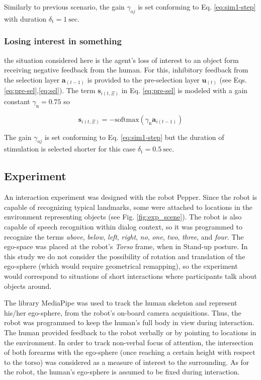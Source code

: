 \documentclass[letterpaper, 10 pt, conference]{ieeeconf}  %
\begin{document}
	\noindent Similarly to previous scenario, the gain $\gamma_{\mathrm{o}j}$ is set conforming to Eq. \eqref{eq:sim1-step} with duration $\delta_\mathrm{t} = 1\ \mathrm{sec}$. 
	
	\subsubsection{Losing interest in something} the situation considered here is the agent's loss of interest to an object form receiving negative feedback from the human. For this, inhibitory feedback from the selection layer $\mathbf{a}_{(t-1)}$ is provided to the pre-selection layer $\mathbf{u}_{(t)}$ (see Eqs. \eqref{eq:pre-sel},\eqref{eq:sel}). The term $\mathbf{s}_{i(t,\Xi)}$ in Eq. \eqref{eq:pre-sel} is modeled with a gain constant $\gamma_\mathrm{n}= 0.75$ so
	
	\begin{equation}
	\mathbf{s}_{i(t,\Xi)} = -\mathrm{softmax}\left(\gamma_\mathrm{n}\mathbf{a}_{i(t-1)}\right)
	\label{eq:sim3}
	\end{equation}
	
	\noindent The gain $\gamma_{\mathrm{o}j}$ is set conforming to Eq. \eqref{eq:sim1-step} but the duration of stimulation is selected shorter for this case $\delta_\mathrm{t} = 0.5\ \mathrm{sec}$. 
		
	
	\subsection{Experiment}
	
	An interaction experiment was designed with the robot Pepper. Since the robot is capable of recognizing typical landmarks, some were attached to locations in the environment representing objects (see Fig. \ref{fig:exp_scene}). The robot is also capable of speech recognition within dialog context, so it was programmed to recognize the terms \textit{above}, \textit{below}, \textit{left}, \textit{right}, \textit{no}, \textit{one}, \textit{two}, \textit{three}, and \textit{four}. The ego-space was placed at the robot's \textit{Torso} frame, when in Stand-up posture. In this study we do not consider the possibility of rotation and translation of the ego-sphere (which would require geometrical remapping), so the experiment would correspond to situations of short interactions where participants talk about objects around. 
	
	The library MediaPipe was used to track the human skeleton and represent his/her ego-sphere, from the robot's on-board camera acquisitions. Thus, the robot was programmed to keep the human's full body in view during interaction. The human provided feedback to the robot verbally or by pointing to locations in the environment. In order to track non-verbal focus of attention, the intersection of both forearms with the ego-sphere (once reaching a certain height with respect to the torso) was considered as a measure of interest to the surrounding. As for the robot, the human's ego-sphere is assumed to be fixed during interaction. 
	
\end{document}
